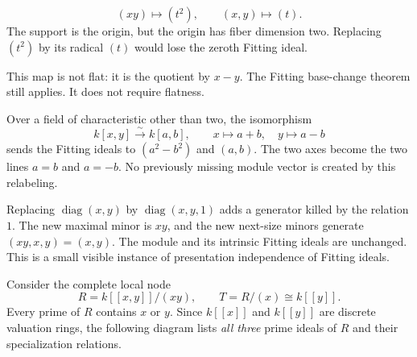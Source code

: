 \begin{minipage}[c]{.44\linewidth}
\end{minipage}\hfill
\begin{minipage}[c]{.51\linewidth}
\[
(xy)\longmapsto(t^2),\qquad
(x,y)\longmapsto(t).
\]
The support is the origin, but the origin has fiber dimension two. Replacing $(t^2)$ by its radical $(t)$ would lose the zeroth Fitting ideal.

This map is not flat: it is the quotient by $x-y$. The Fitting base-change theorem still applies. It does not require flatness.
\end{minipage}

Over a field of characteristic other than two, the isomorphism
\[
k[x,y]\xrightarrow{\sim}k[a,b],\qquad x\mapsto a+b,\quad y\mapsto a-b
\]
sends the Fitting ideals to $(a^2-b^2)$ and $(a,b)$. The two axes become the two lines $a=b$ and $a=-b$. No previously missing module vector is created by this relabeling.

Replacing $\operatorname{diag}(x,y)$ by $\operatorname{diag}(x,y,1)$ adds a generator killed by the relation $1$. The new maximal minor is $xy$, and the new next-size minors generate $(xy,x,y)=(x,y)$. The module and its intrinsic Fitting ideals are unchanged. This is a small visible instance of presentation independence of Fitting ideals.


Consider the complete local node
\[
R=k[[x,y]]/(xy),\qquad T=R/(x)\cong k[[y]].
\]
Every prime of $R$ contains $x$ or $y$. Since $k[[x]]$ and $k[[y]]$ are discrete valuation rings, the following diagram lists \emph{all three} prime ideals of $R$ and their specialization relations.


